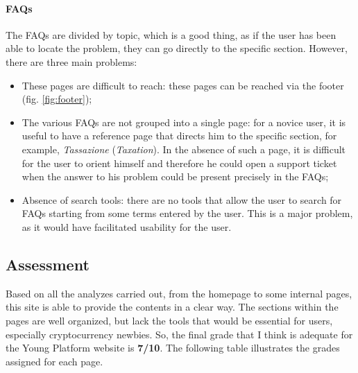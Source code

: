 \paragraph{FAQs}

The FAQs are divided by topic, which is a good thing, as if the user has 
been able to locate the problem, they can go directly to the specific 
section. However, there are three main problems:
\begin{itemize}
  \item These pages are difficult to reach: these pages can be reached via 
  the footer (fig. \ref{fig:footer});
  
  \item The various FAQs are not grouped into a single page: for a novice 
  user, it is useful to have a reference page that directs him to the 
  specific section, for example, \textit{Tassazione} (\textit{Taxation}). 
  In the absence of such a page, it is difficult for the user to orient 
  himself and therefore he could open a support ticket when the answer to 
  his problem could be present precisely in the FAQs;

  \item Absence of search tools: there are no tools that allow the user to 
  search for FAQs starting from some terms entered by the user. This is a 
  major problem, as it would have facilitated usability for the user.
\end{itemize}

\subsection{Assessment}

Based on all the analyzes carried out, from the homepage to some internal 
pages, this site is able to provide the contents in a clear way. The 
sections within the pages are well organized, but lack the tools that 
would be essential for users, especially cryptocurrency newbies. So, the 
final grade that I think is adequate for the Young Platform website is 
\textbf{7/10}. The following table illustrates the grades assigned for 
each page.

